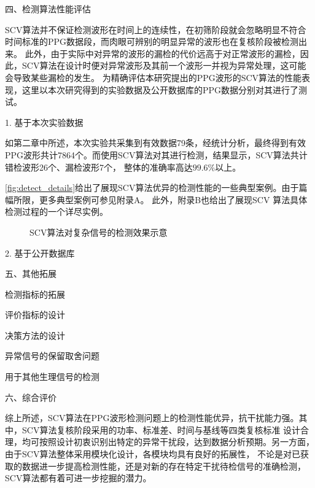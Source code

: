 四、检测算法性能评估

SCV算法并不保证检测波形在时间上的连续性，在初筛阶段就会忽略明显不符合时间标准的PPG数据段，而肉眼可辨别的明显异常的波形也在复核阶段被检测出来。
此外，由于实际中对异常的波形的漏检的代价远高于对正常波形的漏检，因此，SCV算法在设计时便对异常波形及其前一个波形一并视为异常处理，这可能会导致某些漏检的发生。
为精确评估本研究提出的PPG波形的SCV算法的性能表现，这里以本次研究得到的实验数据及公开数据库的PPG数据分别对其进行了测试。

1. 基于本次实验数据

如第二章中所述，本次实验共采集到有效数据79条，经统计分析，最终得到有效PPG波形共计7864个。而使用SCV算法对其进行检测，结果显示，SCV算法共计错检波形26个、漏检波形7个，
整体的准确率高达$99.6\%$以上。

\autoref{fig:detect_details}给出了展现SCV算法优异的检测性能的一些典型案例。由于篇幅所限，更多典型案例可参见附录A。
此外，附录B也给出了展现SCV 算法具体检测过程的一个详尽实例。
\begin{figure}[h]
    \centering
    \quad
    \quad
    \quad
    \caption{\label{fig:detect_details}SCV算法对复杂信号的检测效果示意}
\end{figure}

2. 基于公开数据库





五、其他拓展

检测指标的拓展

评价指标的设计

决策方法的设计

异常信号的保留取舍问题

用于其他生理信号的检测

六、综合评价

综上所述，SCV算法在PPG波形检测问题上的检测性能优异，抗干扰能力强。其中，SCV算法复核阶段采用的功率、标准差、时间与基线等四类复核标准
设计合理，均可按照设计初衷识别出特定的异常干扰段，达到数据分析预期。另一方面，由于SCV算法整体采用模块化设计，各模块均具有良好的拓展性，
不论是对已获取的数据进一步提高检测性能，还是对新的存在特定干扰待检信号的准确检测，SCV算法都有着可进一步挖掘的潜力。

